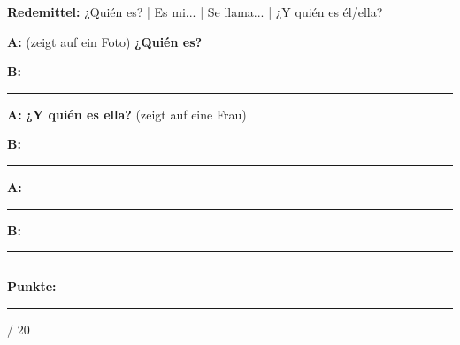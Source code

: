 \documentclass[11pt, a4paper]{article}
\newcommand{\fachfarbe}{spanisch}
\newcommand{\maxpunkte}{20}
\newcommand{\luecke}[1]{\rule{#1}{0.4pt}}
\newcommand{\es}[1]{\textcolor{\fachfarbe}{\textbf{#1}}}
\begin{document}
\begin{hinweis}
\textbf{Redemittel:} ¿Quién es? | Es mi... | Se llama... | ¿Y quién es él/ella?
\end{hinweis}

\vspace{0.5em}

\noindent
\textbf{A:} (zeigt auf ein Foto) \es{¿Quién es?}

\vspace{0.3em}
\textbf{B:} \luecke{8cm}

\vspace{0.3em}
\textbf{A:} \es{¿Y quién es ella?} (zeigt auf eine Frau)

\vspace{0.3em}
\textbf{B:} \luecke{8cm}

\vspace{0.3em}
\textbf{A:} \luecke{8cm}

\vspace{0.3em}
\textbf{B:} \luecke{8cm}

\vspace{20pt}
\hrule
\vspace{10pt}

\begin{flushright}
\textbf{Punkte:} \luecke{1cm} / \maxpunkte
\end{flushright}
\end{document}
